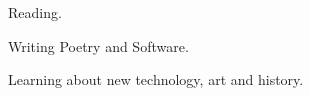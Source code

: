 

\begin{cvparagraph}
    \vspace{1em}
    {
      \begin{cvitems} %
        \item {Reading.}
        \item {Writing Poetry and Software.}
        \item {Learning about new technology, art and history.}
      \end{cvitems}
    }

\end{cvparagraph}
